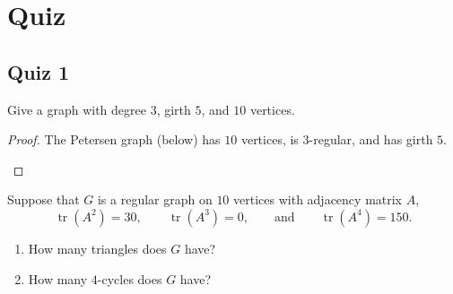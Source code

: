 \documentclass[11pt, a4paper]{ctexrep}
\newcommand{\R}{\mathbb{R}}
\begin{document}
\chapter{Quiz}

\section{Quiz 1}

\begin{exercise}
    Give a graph with degree $3$, girth $5$, and $10$ vertices.
\end{exercise}

\begin{proof}
    The Petersen graph (below) has $10$ vertices, is $3$-regular, and has girth $5$.
    \begin{center}
    \end{center}
\end{proof}

\begin{exercise}
    Suppose that $G$ is a regular graph on $10$ vertices with adjacency matrix $A$,
    \[
        \operatorname{tr}(A^2)=30,\qquad \operatorname{tr}(A^3)=0,\qquad \text{and}\qquad \operatorname{tr}(A^4)=150.
    \]
    \begin{enumerate}
        \item[(a)] How many triangles does $G$ have?
        \item[(b)] How many $4$-cycles does $G$ have?
    \end{enumerate}
\end{exercise}
\end{document}
